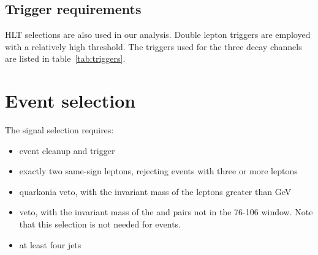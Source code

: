 \subsection{Trigger requirements}
HLT selections are also used in our analysis. Double lepton triggers are
employed with a relatively high \pt threshold. The triggers used for the
three decay channels are listed in table~\ref{tab:triggers}.


\section{Event selection}
The signal selection requires:
\begin{itemize}
    \item event cleanup and trigger
    \item exactly two same-sign leptons, rejecting events with three or more
        leptons
    \item quarkonia veto, with the invariant mass of the leptons greater
        than \unit[20]{GeV}
    \item \Z veto, with the invariant mass of the \E\E and \M\M pairs not in
        the 76-106 window. Note that this selection is not needed for \E\M
        events.
    \item at least four jets
\end{itemize}

